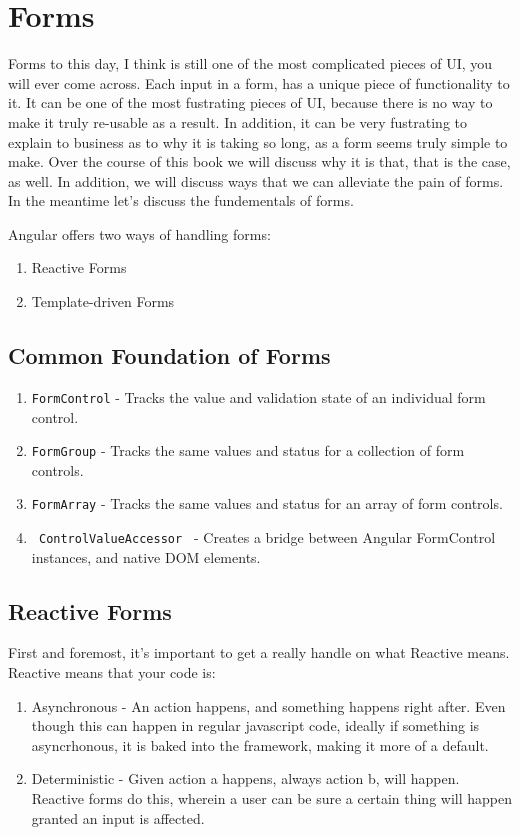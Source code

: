 \maketitle{}
\section{ Forms }

Forms to this day, I think is still one of the most complicated pieces of UI,
you will ever come across. Each input in a form, has a unique piece of 
functionality to it. It can be one of the most fustrating pieces of UI, 
because there is no way to make it truly re-usable as a result. In 
addition, it can be very fustrating to explain to business as to why it is 
taking so long, as a form seems truly simple to make. Over the course of this 
book we will discuss why it is that, that is the case, as well. In addition,
we will discuss ways that we can alleviate the pain of forms. In the meantime 
let's discuss the fundementals of forms. 

Angular offers two ways of handling forms: 
\begin{enumerate}
  \item Reactive Forms 
  \item Template-driven Forms
\end{enumerate}

\subsection{ Common Foundation of Forms }
\begin{enumerate}
  \item \lstinline{FormControl} - Tracks the value and validation state of an 
  individual form control.
  \item \lstinline{FormGroup} - Tracks the same values and status for a 
  collection of form controls.
  \item \lstinline{FormArray} - Tracks the same values and status for an array
  of form controls. 
  \item \lstinline{ ControlValueAccessor } - Creates a bridge between Angular
  FormControl instances, and native DOM elements.
\end{enumerate}

\subsection{ Reactive Forms }
First and foremost, it's important to get a really handle on what Reactive 
means. Reactive means that your code is:
\begin{enumerate}
  \item Asynchronous - An action happens, and something happens right after. 
  Even though this can happen in regular javascript code, ideally if 
  something is asyncrhonous, it is baked into the framework, making it 
  more of a default.
  \item Deterministic -  Given action a happens, always action b, will 
  happen. Reactive forms do this, wherein a user can be sure a certain 
  thing will happen granted an input is affected.
\end{enumerate}

